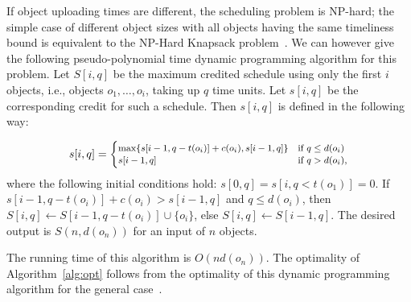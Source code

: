 %
If object uploading times are different, the scheduling problem is NP-hard; the
simple case of different object sizes with all objects having the same
timeliness bound is equivalent to the NP-Hard Knapsack
problem~\cite{GarJoh79}.
%
We can however give the following pseudo-polynomial time dynamic
programming algorithm for this problem.
%
Let $S[i,q]$ be the maximum credited schedule using only the first $i$
objects, i.e., objects $o_1,\ldots,o_i$, taking up $q$ time units.
%
Let $s[i,q]$ be the corresponding credit for such a schedule.
%
Then $s[i,q]$ is defined in the following way:
%

\begin{equation}\small
s[i,q]=\begin{cases}\max\{s[i-1,q-t(o_{i})]+c(o_{i}),s[i-1,q]\} & \mbox{if } q\le d(o_i)\\
                     s[i-1,q]      &  \mbox{if } q>d(o_i),\\
        \end{cases}
\end{equation}
%
where the following initial conditions hold: $s[0,q]=s[i,q<t(o_1)]=0$.
%
If $s[i-1,q-t(o_{i})]+c(o_{i})>s[i-1,q]$ and $q\le d(o_i)$, then
$S[i,q]\leftarrow S[i-1,q-t(o_{i})]\cup \{o_i\}$, else
$S[i,q]\leftarrow S[i-1,q]$.
%
The desired output is $S(n,d(o_n))$ for an input of $n$ objects.
%

The running time of this algorithm is $O(nd(o_n))$.
%
The optimality of Algorithm~\ref{alg:opt} follows from the
optimality of this dynamic programming algorithm for the
general case~\cite{Schedhandbook}.
%

